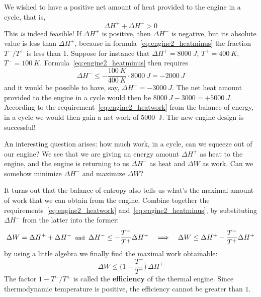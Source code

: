 \documentclass[a4paper,12pt,%
onecolumn,oneside,%
british%
]{memoir}
\newcommand*{\incr}{\Delta}%
\renewcommand*{\|}[1][]{\nonscript\:#1\vert\nonscript\:\mathopen{}}
\newcommand*{\yhep}{\incr H^{+}}%
\newcommand*{\yhem}{\incr H^{-}}%
\newcommand*{\yW}{\incr W}%
\newcommand*{\yT}{T}%
\newcommand*{\yTp}{\yT^{+}}%
\newcommand*{\yTm}{\yT^{-}}%
\begin{document}
We wished to have a positive net amount of heat provided to the engine in a cycle, that is,
\begin{equation*}
  \yhep + \yhem > 0
\end{equation*}
This \emph{is} indeed feasible! If $\yhep$ is positive, then $\yhem$ is negative, but its absolute value is less than $\yhep$, because in formula~\eqref{eq:engine2_heatminus} the fraction $\yTm/\yTp$ is less than $1$. Suppose for instance that $\yhep=\qty{8000}{J}$, $\yTp=\qty{400}{K}$, $\yTm=\qty{100}{K}$. Formula~\eqref{eq:engine2_heatminus} then requires
\begin{equation*}
  \yhem \le -\frac{\qty{100}{K}}{\qty{400}{K}}\cdot\qty{8000}{J} = -\qty{2000}{J}
\end{equation*}
and it would be possible to have, say, $\yhem=-\qty{3000}{J}$. The net heat amount provided to the engine in a cycle would then be $\qty{8000}{J}-\qty{3000} = +\qty{5000}{J}$. According to the requirement~\eqref{eq:engine2_heatwork} from the balance of energy, in a cycle we would then gain a net work of \qty{5000}{J}. The new engine design is successful!

\medskip

An interesting question arises: how much work, in a cycle, can we squeeze out of our engine? We see that we are giving an energy amount $\yhep$ as heat to the engine, and the engine is returning to us $\yhem$ as heat and $\yW$ as work. Can we somehow minimize $\yhem$ and maximize $\yW$?

It turns out that the balance of entropy also tells us what's the maximal amount of work that we can obtain from the engine. Combine together the requirements~\eqref{eq:engine2_heatwork} and~\eqref{eq:engine2_heatminus}, by substituting $\yhem$ from the latter into the former:
\begin{equation*}
  \yW = \yhep + \yhem
  \enskip\text{\footnotesize and}\enskip
  \yhem \le -\frac{\yTm}{\yTp}\yhep
\quad\Longrightarrow\quad
  \yW \le \yhep -\frac{\yTm}{\yTp}\yhep
\end{equation*}
by using a little algebra we finally find the maximal work obtainable:
\begin{equation}\label{eq:thermal_efficiency}
  \yW \le \biggl(1-\frac{\yTm}{\yTp}\biggr)\,\yhep
\end{equation}
The factor $1-\yTm/\yTp$ is called the \textbf{efficiency} of the thermal engine. Since thermodynamic temperature is positive, the efficiency cannot be greater than $1$.
\end{document}
